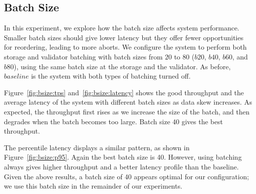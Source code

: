\subsection{Batch Size}
In this experiment, we explore how the batch size affects system performance. 
Smaller batch sizes should give lower latency but they offer fewer opportunities for reordering, leading to more aborts. 
We configure the system to perform both storage and validator batching with batch sizes from $20$ to $80$ ($b20$, $b40$, $b60$, and $b80$), using the same batch size at the storage and the validator. As before, $baseline$ is the system with both types of batching turned off. 

Figure~\ref{fig:bsize:tps} and~\ref{fig:bsize:latency} shows the good throughput and the average latency of the system with different batch sizes as data skew increases. As expected, the throughput first rises as we increase the size of the batch, and then degrades when the batch becomes too large. Batch size 40 gives the best throughput.

The percentile latency displays a similar pattern, as shown in Figure~\ref{fig:bsize:p95}. Again the best batch size is 40. However, using batching always gives higher throughput and a better latency profile than the baseline. Given the above results, a batch size of 40 appears optimal for our configuration; we use this batch size in the remainder of our experiments. 